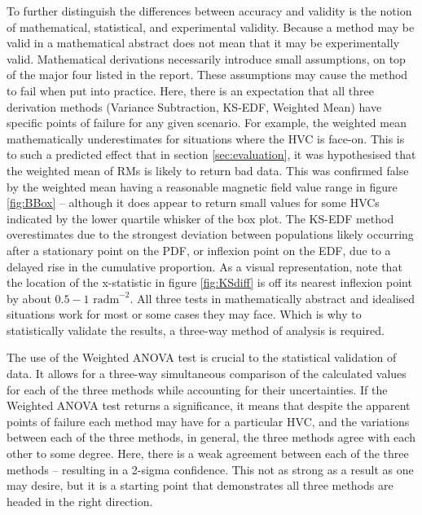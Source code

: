 To further distinguish the differences between accuracy and validity is the notion of mathematical, statistical, and experimental validity. Because a method may be valid in a mathematical abstract does not mean that it may be experimentally valid. Mathematical derivations necessarily introduce small assumptions, on top of the major four listed in the report. These assumptions may cause the method to fail when put into practice. Here, there is an expectation that all three derivation methods (Variance Subtraction, KS-EDF, Weighted Mean) have specific points of failure for any given scenario. For example, the weighted mean mathematically underestimates for situations where the HVC is face-on. This is to such a predicted effect that in section \ref{sec:evaluation}, it was hypothesised that the weighted mean of RMs is likely to return bad data. This was confirmed false by the weighted mean having a reasonable magnetic field value range in figure \ref{fig:BBox} – although it does appear to return small values for some HVCs indicated by the lower quartile whisker of the box plot. The KS-EDF method overestimates due to the strongest deviation between populations likely occurring after a stationary point on the PDF, or inflexion point on the EDF, due to a delayed rise in the cumulative proportion. As a visual representation, note that the location of the x-statistic in figure \ref{fig:KSdiff} is off its nearest inflexion point by about $0.5-1$ $\mathrm{rad m}^{-2}$. All three tests in mathematically abstract and idealised situations work for most or some cases they may face. Which is why to statistically validate the results, a three-way method of analysis is required.


The use of the Weighted ANOVA test is crucial to the statistical validation of data. It allows for a three-way simultaneous comparison of the calculated values for each of the three methods while accounting for their uncertainties. If the Weighted ANOVA test returns a significance, it means that despite the apparent points of failure each method may have for a particular HVC, and the variations between each of the three methods, in general, the three methods agree with each other to some degree. Here, there is a weak agreement between each of the three methods – resulting in a 2-sigma confidence. This not as strong as a result as one may desire, but it is a starting point that demonstrates all three methods are headed in the right direction.


